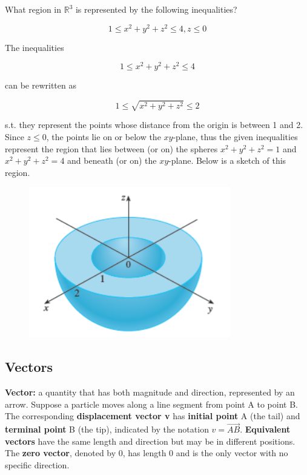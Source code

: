         \textit{} What region in $\mathbb{R}^3$ is represented by the following inequalities?

        \[
            1 \leq x^2 + y^2 + z^2 \leq 4, z\leq 0
        \]

        The inequalities

        \[
            1 \leq x^2 + y^2 + z^2 \leq 4
        \]

        can be rewritten as

        \[
            1 \leq \sqrt{x^2 + y^2 + z^2} \leq 2
        \]

        s.t. they represent the points whose distance from the origin is between 1 and 2. Since $z\leq 0$, the points lie on or below the $xy$-plane, thus the given inequalities represent the region that lies between
        (or on) the spheres $x^2 + y^2 + z^2 = 1$ and $x^2 + y^2 + z^2 = 4$ and beneath (or on) the $xy$-plane. Below is a sketch of this region.

        \begin{figure}[hbt!]
            \centering
            \includegraphics[scale=0.75]{Resources/12.1_Inequalities}
        \end{figure}

    \subsection{Vectors}        %

        \textbf{Vector:} a quantity that has both magnitude and direction, represented by an arrow. Suppose a particle moves along a line segment from point A to point B. The corresponding \textbf{displacement vector v}
        has \textbf{initial point} A (the tail) and \textbf{terminal point} B (the tip), indicated by the notation $v = \vec{AB}$. \textbf{Equivalent vectors} have the same length and direction but may be in different
        positions. The \textbf{zero vector}, denoted by 0, has length 0 and is the only vector with no specific direction. \\

